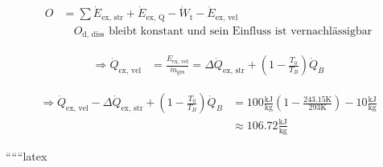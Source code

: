 \begin{align*}
O &= \sum \dot{E}_{\text{ex, str}} + \dot{E}_{\text{ex, Q}} - \dot{W}_{\text{t}} - \dot{E}_{\text{ex, vel}} \\
&\quad O_{\text{d, diss}} \text{ bleibt konstant und sein Einfluss ist vernachlässigbar}
\end{align*}

\begin{align*}
\Rightarrow \dot{Q}_{\text{ex, vel}} &= \frac{E_{\text{ex, vel}}}{\dot{m}_{\text{ges}}} = \Delta \dot{Q}_{\text{ex, str}} + \left(1 - \frac{T_0}{T_B}\right) \dot{Q}_B
\end{align*}

\begin{align*}
\Rightarrow \dot{Q}_{\text{ex, vel}} - \Delta \dot{Q}_{\text{ex, str}} + \left(1 - \frac{T_0}{T_B}\right) \dot{Q}_B &= 100 \frac{\text{kJ}}{\text{kg}} \left(1 - \frac{243.15 \text{K}}{293 \text{K}}\right) - 10 \frac{\text{kJ}}{\text{kg}} \\
&\approx 106.72 \frac{\text{kJ}}{\text{kg}}
\end{align*}

``````latex